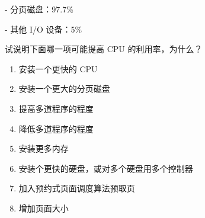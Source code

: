 \documentclass[UTF8]{ctexart}
\begin{document}
\begin{enumerate}
\begin{enumerate}
		- 分页磁盘：97.7\%
		
		- 其他 I/O 设备：5\%
		
		试说明下面哪一项可能提高 CPU 的利用率，为什么？
		\begin{enumerate}
			\item 安装一个更快的 CPU
			\item 安装一个更大的分页磁盘
			\item 提高多道程序的程度
			\item 降低多道程序的程度
			\item 安装更多内存
			\item 安装个更快的硬盘，或对多个硬盘用多个控制器
			\item 加入预约式页面调度算法预取页
			\item 增加页面大小
		\end{enumerate}
	\end{enumerate}
\end{enumerate}
\end{document}
